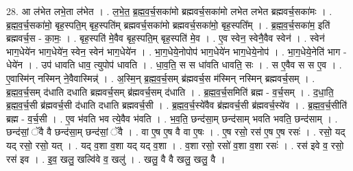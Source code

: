 \documentclass[17pt]{extarticle}
\begin{document}
28. आ ल॑भेत लभे॒ता ल॑भेत । . ल॒भे॒त॒ ब्र॒ह्म॒व॒र्च॒सका॑मो ब्रह्मवर्च॒सका॑मो लभेत लभेत ब्रह्मवर्च॒सका॑मः । . ब्र॒ह्म॒व॒र्च॒सका॑मो॒ बृह॒स्पति॒म् बृह॒स्पति॑म् ब्रह्मवर्च॒सका॑मो ब्रह्मवर्च॒सका॑मो॒ बृह॒स्पति᳚म् । . ब्र॒ह्म॒व॒र्च॒सका॑म॒ इति॑ ब्रह्मवर्च॒स - का॒मः॒ । . बृह॒स्पति॑ मे॒वैव बृह॒स्पति॒म् बृह॒स्पति॑ मे॒व । . ए॒व स्वेन॒ स्वेनै॒वैव स्वेन॑ । . स्वेन॑ भाग॒धेये॑न भाग॒धेये॑न॒ स्वेन॒ स्वेन॑ भाग॒धेये॑न । . भा॒ग॒धेये॒नोपोप॑ भाग॒धेये॑न भाग॒धेये॒नोप॑ । . भा॒ग॒धेये॒नेति॑ भाग - धेये॑न । . उप॑ धावति धाव॒ त्युपोप॑ धावति । . धा॒व॒ति॒ स स धा॑वति धावति॒ सः । . स ए॒वैव स स ए॒व । . ए॒वास्मि॑न् नस्मिन् ने॒वैवास्मिन्न्॑ । . अ॒स्मि॒न् ब्र॒ह्म॒व॒र्च॒सम् ब्र॑ह्मवर्च॒स म॑स्मिन् नस्मिन् ब्रह्मवर्च॒सम् । . ब्र॒ह्म॒व॒र्च॒सम् द॑धाति दधाति ब्रह्मवर्च॒सम् ब्र॑ह्मवर्च॒सम् द॑धाति । . ब्र॒ह्म॒व॒र्च॒समिति॑ ब्रह्म - व॒र्च॒सम् । . द॒धा॒ति॒ ब्र॒ह्म॒व॒र्च॒सी ब्र॑ह्मवर्च॒सी द॑धाति दधाति ब्रह्मवर्च॒सी । . ब्र॒ह्म॒व॒र्च॒स्ये॑वैव ब्र॑ह्मवर्च॒सी ब्र॑ह्मवर्च॒स्ये॑व । . ब्र॒ह्म॒व॒र्च॒सीति॑ ब्रह्म - व॒र्च॒सी । . ए॒व भ॑वति भव त्ये॒वैव भ॑वति । . भ॒व॒ति॒ छन्द॑सा॒म् छन्द॑साम् भवति भवति॒ छन्द॑साम् । . छन्द॑सां॒ ॅवै वै छन्द॑सा॒म् छन्द॑सां॒ ॅवै । . वा ए॒ष ए॒ष वै वा ए॒षः । . ए॒ष रसो॒ रस॑ ए॒ष ए॒ष रसः॑ । . रसो॒ यद् यद् रसो॒ रसो॒ यत् । . यद् व॒शा व॒शा यद् यद् व॒शा । . व॒शा रसो॒ रसो॑ व॒शा व॒शा रसः॑ । . रस॑ इवे व॒ रसो॒ रस॑ इव । . इ॒व॒ खलु॒ खल्वि॑वे व॒ खलु॑ । . खलु॒ वै वै खलु॒ खलु॒ वै । \newline
\end{document}
